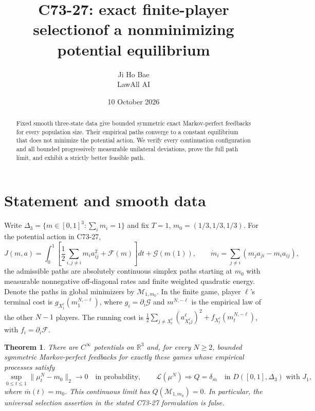 \documentclass[11pt,a4paper]{article}
\title{C73-27: exact finite-player selection\newline of a nonminimizing potential equilibrium}
\author{Ji Ho Bae\\\small LawAll AI}
\date{10 October 2026}
\newtheorem{theorem}{Theorem}
\newcommand{\R}{\mathbb R}
\begin{document}
\maketitle
\begin{abstract}
Fixed smooth three-state data give bounded symmetric exact Markov-perfect
feedbacks for every population size. Their empirical paths converge to
a constant equilibrium that does not minimize the potential action.
We verify every continuation configuration and all bounded progressively
measurable unilateral deviations, prove the full path limit, and exhibit
a strictly better feasible path.
\end{abstract}

\section{Statement and smooth data}
Write $\Delta_3=\{m\in[0,1]^3:\sum_i m_i=1\}$ and fix
$T=1$, $m_0=(1/3,1/3,1/3)$. For the potential action in C73-27,
\begin{equation}\label{action}
 J(m,a)=\int_0^1\left[\frac12\sum_{i,j\ne i}m_i a_{ij}^2+
 \mathcal F(m)\right]dt+\mathcal G(m(1)),\qquad
 \dot m_i=\sum_{j\ne i}(m_ja_{ji}-m_ia_{ij}),
\end{equation}
the admissible paths are absolutely continuous simplex paths starting
at $m_0$ with measurable nonnegative off-diagonal rates and finite
weighted quadratic energy. Denote the paths in global minimizers by
$\mathcal M_{1,m_0}$. In the finite game, player $\ell$'s terminal cost is
$g_{X_1^\ell}(m_1^{N,-\ell})$, where $g_i=\partial_i\mathcal G$ and
$m^{N,-\ell}$ is the empirical law of the other $N-1$ players.
The running cost is $\frac12\sum_{j\ne X_t^\ell}(a^\ell_{X_t^\ell j})^2+
f_{X_t^\ell}(m_t^{N,-\ell})$, with $f_i=\partial_i\mathcal F$.

\begin{theorem}\label{main}
There are $C^\infty$ potentials on $\R^3$ and, for every $N\ge2$,
bounded symmetric Markov-perfect feedbacks for exactly these games
whose empirical processes satisfy
\[
 \sup_{0\le t\le1}\|\mu_t^N-m_0\|_2\longrightarrow0
 \quad\text{in probability},\qquad
 \mathcal L(\mu^N)\Longrightarrow Q=\delta_{\bar m}
 \quad\text{in }D([0,1],\Delta_3)\text{ with }J_1,
\]
where $\bar m(t)=m_0$. This continuous limit has
$Q(\mathcal M_{1,m_0})=0$. In particular, the universal selection
assertion in the stated C73-27 formulation is false.
\end{theorem}
\end{document}
